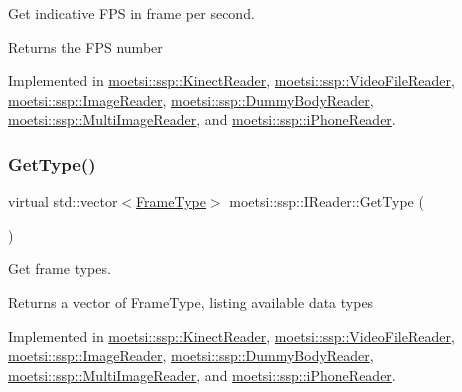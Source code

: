 Get indicative F\+PS in frame per second. 

\begin{DoxyReturn}{Returns}
the F\+PS number 
\end{DoxyReturn}


Implemented in \hyperlink{classmoetsi_1_1ssp_1_1KinectReader_ac88c13693ce8e2e249438ac8de8a7b3c}{moetsi\+::ssp\+::\+Kinect\+Reader}, \hyperlink{classmoetsi_1_1ssp_1_1VideoFileReader_a83359ad82898acdb75240568b182247c}{moetsi\+::ssp\+::\+Video\+File\+Reader}, \hyperlink{classmoetsi_1_1ssp_1_1ImageReader_a86adfec8106c366aaf1ec63e2a7da156}{moetsi\+::ssp\+::\+Image\+Reader}, \hyperlink{classmoetsi_1_1ssp_1_1DummyBodyReader_a7dab48cb8ec247add0c57d98e6cd5fb4}{moetsi\+::ssp\+::\+Dummy\+Body\+Reader}, \hyperlink{classmoetsi_1_1ssp_1_1MultiImageReader_ad0a249af66f8e1a063c3e575fc1b94cb}{moetsi\+::ssp\+::\+Multi\+Image\+Reader}, and \hyperlink{classmoetsi_1_1ssp_1_1iPhoneReader_a4bb216847a6c2ed8eb5d31788a0b8477}{moetsi\+::ssp\+::i\+Phone\+Reader}.

\mbox{\label{classmoetsi_1_1ssp_1_1IReader_a4116c1931fde7bd66133934ffdca1cce}} 
\subsubsection{\texorpdfstring{Get\+Type()}{GetType()}\hspace{0.1cm}{\footnotesize\ttfamily [1/2]}}
{\footnotesize\ttfamily virtual std\+::vector$<$\hyperlink{namespacemoetsi_1_1ssp_a46efdfa2cd5a28ead465dcc8006b5a87}{Frame\+Type}$>$ moetsi\+::ssp\+::\+I\+Reader\+::\+Get\+Type (\begin{DoxyParamCaption}{ }\end{DoxyParamCaption})\hspace{0.3cm}{\ttfamily [pure virtual]}}



Get frame types. 

\begin{DoxyReturn}{Returns}
a vector of Frame\+Type, listing available data types 
\end{DoxyReturn}


Implemented in \hyperlink{classmoetsi_1_1ssp_1_1KinectReader_aef896aa686cbe1ea82dfc6aad46b6ff7}{moetsi\+::ssp\+::\+Kinect\+Reader}, \hyperlink{classmoetsi_1_1ssp_1_1VideoFileReader_a9d47af47299c5fccf766ac2d848a561b}{moetsi\+::ssp\+::\+Video\+File\+Reader}, \hyperlink{classmoetsi_1_1ssp_1_1ImageReader_af6f66957b6e3268c5336f4176c77fc73}{moetsi\+::ssp\+::\+Image\+Reader}, \hyperlink{classmoetsi_1_1ssp_1_1DummyBodyReader_a2219d7fd14ca1448fb4c6f2541ac3c9b}{moetsi\+::ssp\+::\+Dummy\+Body\+Reader}, \hyperlink{classmoetsi_1_1ssp_1_1MultiImageReader_ad5f6cf0cfb1e64bcf569ab0bbfcce9d6}{moetsi\+::ssp\+::\+Multi\+Image\+Reader}, and \hyperlink{classmoetsi_1_1ssp_1_1iPhoneReader_a05d285ace85fc570bc2f453a0862ae56}{moetsi\+::ssp\+::i\+Phone\+Reader}.

